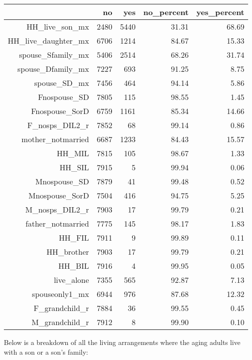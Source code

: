 \documentclass[11pt]{article}
\begin{document}
\begin{table}[ht]
\centering
\begin{tabular}{rrrrr}
  \hline
 & no & yes & no\_percent & yes\_percent \\ 
  \hline
HH\_live\_son\_mx & 2480 & 5440 & 31.31 & 68.69 \\ 
  HH\_live\_daughter\_mx & 6706 & 1214 & 84.67 & 15.33 \\ 
  spouse\_Sfamily\_mx & 5406 & 2514 & 68.26 & 31.74 \\ 
  spouse\_Dfamily\_mx & 7227 & 693 & 91.25 & 8.75 \\ 
  spouse\_SD\_mx & 7456 & 464 & 94.14 & 5.86 \\ 
  Fnospouse\_SD & 7805 & 115 & 98.55 & 1.45 \\ 
  Fnospouse\_SorD & 6759 & 1161 & 85.34 & 14.66 \\ 
  F\_nosps\_DIL2\_r & 7852 & 68 & 99.14 & 0.86 \\ 
  mother\_notmarried & 6687 & 1233 & 84.43 & 15.57 \\ 
  HH\_MIL & 7815 & 105 & 98.67 & 1.33 \\ 
  HH\_SIL & 7915 & 5 & 99.94 & 0.06 \\ 
  Mnospouse\_SD & 7879 & 41 & 99.48 & 0.52 \\ 
  Mnospouse\_SorD & 7504 & 416 & 94.75 & 5.25 \\ 
  M\_nosps\_DIL2\_r & 7903 & 17 & 99.79 & 0.21 \\ 
  father\_notmarried & 7775 & 145 & 98.17 & 1.83 \\ 
  HH\_FIL & 7911 & 9 & 99.89 & 0.11 \\ 
  HH\_brother & 7903 & 17 & 99.79 & 0.21 \\ 
  HH\_BIL & 7916 & 4 & 99.95 & 0.05 \\ 
  live\_alone & 7355 & 565 & 92.87 & 7.13 \\ 
  spouseonly1\_mx & 6944 & 976 & 87.68 & 12.32 \\ 
  F\_grandchild\_r & 7884 & 36 & 99.55 & 0.45 \\ 
  M\_grandchild\_r & 7912 & 8 & 99.90 & 0.10 \\ 
   \hline
\end{tabular}
\end{table}\newline
Below is a breakdown of all the living arrangements where the aging adults live with a son or a son's family:\\
\end{document}
